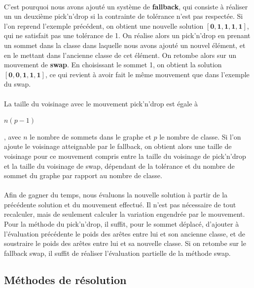 \documentclass[12pt]{article}
\begin{document}
\paragraph{}C'est pourquoi nous avons ajouté un système de \textbf{fallback}, qui consiste à réaliser un un deuxième pick'n'drop si la contrainte de tolérance n'est pas respectée. Si l'on reprend l'exemple précédent, on obtient une nouvelle solution 
$\mathbf{[0,1,1,1,1]}$, qui ne satisfait pas une tolérance de 1. On réalise alors un pick'n'drop en prenant un sommet dans la classe dans laquelle nous avons ajouté un nouvel élément, et en le mettant dans l'ancienne classe de cet élément. On retombe alors sur un mouvement de \textbf{swap}. En choisissant le sommet 1, on obtient la solution $\mathbf{[0,0,1,1,1]}$, ce qui revient à avoir fait le même mouvement que dans l'exemple du swap.

\paragraph{}La taille du voisinage avec le mouvement pick'n'drop est égale à
\begin{large}$n\left(p-1\right)$\end{large}, avec $n$ le nombre de sommets dans le graphe et $p$ le nombre de classe. Si l'on ajoute le voisinage atteignable par le fallback, on obtient alors une taille de voisinage pour ce mouvement compris entre la taille du voisinage de pick'n'drop et la taille du voisinage de swap, dépendant de la tolérance et du nombre de sommet du graphe par rapport au nombre de classe.

\paragraph{}Afin de gagner du temps, nous évaluons la nouvelle solution à partir de la précédente solution et du mouvement effectué. Il n'est pas nécessaire de tout recalculer, mais de seulement calculer la variation engendrée par le mouvement. Pour la méthode du pick'n'drop, il suffit, pour le sommet déplacé, d'ajouter à l'évaluation précédente le poids des arêtes entre lui et son ancienne classe, et de soustraire le poids des arêtes entre lui et sa nouvelle classe. Si on retombe sur le fallback swap, il suffit de réaliser l'évaluation partielle de la méthode swap.

\subsection{Méthodes de résolution}
\end{document}
